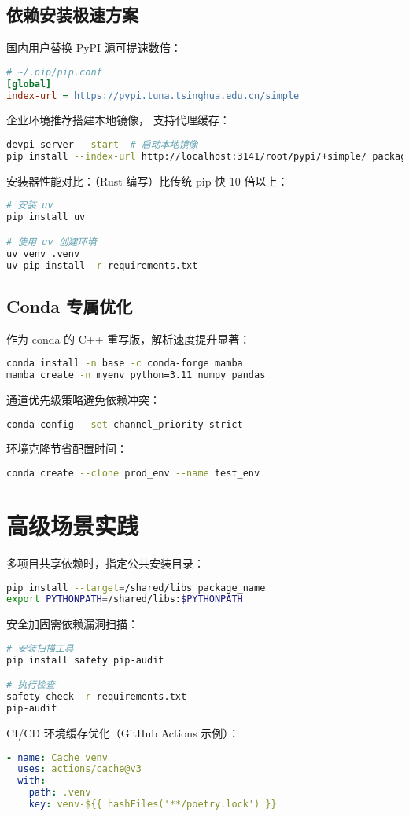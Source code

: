 \section{依赖安装极速方案}
国内用户替换 PyPI 源可提速数倍：\par
\begin{lstlisting}[language=ini]
# ~/.pip/pip.conf
[global]
index-url = https://pypi.tuna.tsinghua.edu.cn/simple
\end{lstlisting}
企业环境推荐搭建本地镜像， 支持代理缓存：\par
\begin{lstlisting}[language=bash]
devpi-server --start  # 启动本地镜像
pip install --index-url http://localhost:3141/root/pypi/+simple/ package
\end{lstlisting}
安装器性能对比：（Rust 编写）比传统 pip 快 10 倍以上：\par
\begin{lstlisting}[language=bash]
# 安装 uv
pip install uv

# 使用 uv 创建环境
uv venv .venv  
uv pip install -r requirements.txt
\end{lstlisting}
\section{Conda 专属优化}
 作为 conda 的 C++ 重写版，解析速度提升显著：\par
\begin{lstlisting}[language=bash]
conda install -n base -c conda-forge mamba
mamba create -n myenv python=3.11 numpy pandas
\end{lstlisting}
通道优先级策略避免依赖冲突：\par
\begin{lstlisting}[language=bash]
conda config --set channel_priority strict
\end{lstlisting}
环境克隆节省配置时间：\par
\begin{lstlisting}[language=bash]
conda create --clone prod_env --name test_env
\end{lstlisting}
\chapter{高级场景实践}
多项目共享依赖时，指定公共安装目录：\par
\begin{lstlisting}[language=bash]
pip install --target=/shared/libs package_name
export PYTHONPATH=/shared/libs:$PYTHONPATH
\end{lstlisting}
安全加固需依赖漏洞扫描：\par
\begin{lstlisting}[language=bash]
# 安装扫描工具
pip install safety pip-audit

# 执行检查
safety check -r requirements.txt
pip-audit
\end{lstlisting}
CI/CD 环境缓存优化（GitHub Actions 示例）：\par
\begin{lstlisting}[language=yaml]
- name: Cache venv
  uses: actions/cache@v3
  with:
    path: .venv
    key: venv-${{ hashFiles('**/poetry.lock') }}
\end{lstlisting}

